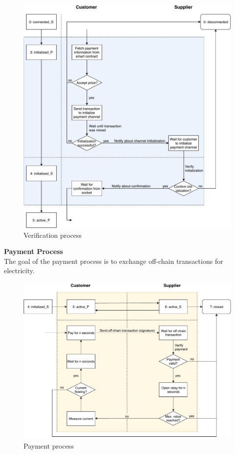 \begin{figure}[H]
    \includegraphics[width=\textwidth]{img/Plug-Socket-verification_process.pdf}
    \caption{Verification process}
    \label{fig:verification_process}
\end{figure}
\leavevmode
\newpage
\textbf{Payment Process}\\
The goal of the payment process is to exchange off-chain transactions for electricity.
\\
\begin{figure}[H]
    \includegraphics[width=\textwidth]{img/Plug-Socket-payment_process.pdf}
    \caption{Payment process}
    \label{fig:payment_process}
\end{figure}
